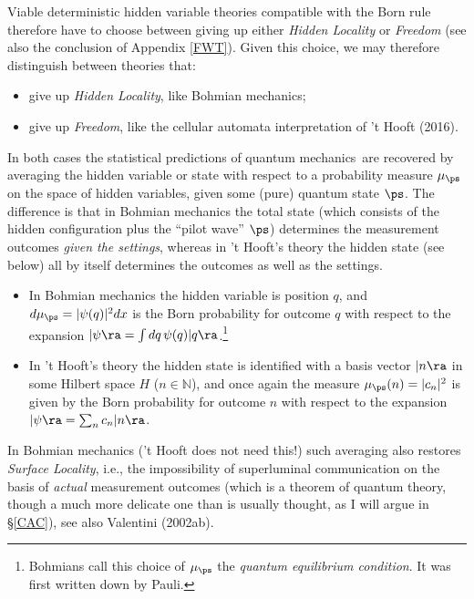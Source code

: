 \documentclass[12pt]{article}
\numberwithin{equation}{section}
\newcommand{\qm}{quantum mechanics}
\newcommand{\N}{{\mathbb N}} \newcommand{\R}{{\mathbb R}}
\begin{document}
   Viable deterministic hidden variable theories compatible with the Born rule therefore have to choose between giving up either \emph{Hidden Locality} or  \emph{Freedom} (see also the conclusion of Appendix \ref{FWT}). 
   Given this choice, we may  therefore distinguish between theories that:
  \begin{itemize}
\item  give up  \emph{Hidden Locality}, like Bohmian mechanics;
 \item  give up  \emph{Freedom}, like the cellular automata interpretation of 't Hooft (2016).
 \end{itemize}
 In both cases the statistical predictions of \qm\ are recovered by averaging the hidden variable or state with respect to 
 a probability measure $\mu_{\ps}$ on the space of hidden variables, given some (pure) quantum state $\ps$. The difference is that in Bohmian mechanics the total state (which consists of the hidden configuration plus the ``pilot wave'' $\ps$) determines the measurement outcomes \emph{given the settings}, whereas in  't Hooft's theory 
 the hidden state (see below) all by itself determines the outcomes as well as the settings.
 \begin{itemize}
\item  In Bohmian mechanics the hidden variable is position $q$, and $d\mu_{\ps}=|\psi(q)|^2 dx$ is  the Born probability for outcome $q$ with respect to the expansion $|\psi\ra=\int dq\, \psi(q) |q\ra$.\footnote{Bohmians call this choice of $\mu_{\ps}$ the  \emph{quantum equilibrium condition}. It was first written down by Pauli.}
\item In 't Hooft's theory the hidden state  is identified with a basis vector $|n\ra$ in some Hilbert space $H$ ($n\in\N$), and once again the measure $\mu_{\ps}(n)=|c_{n}|^2$  is given by the Born probability for outcome $n$ with respect to the expansion $|\psi\ra=\sum_n c_n|n\ra$. 
\end{itemize}
In Bohmian mechanics ('t Hooft does not need this!) such averaging  also restores \emph{Surface Locality}, i.e.,   the impossibility of  superluminal communication on the basis of \emph{actual} measurement outcomes (which is a theorem of quantum theory, though a much more delicate one than is usually thought, as I will argue in \S\ref{CAC}), see also  Valentini (2002ab).
\end{document}
